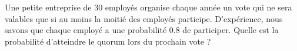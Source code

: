 
\begin{exercice}\label{exoPremiere-0099}

    Une petite entreprise de \( 30\) employés organise chaque année un vote qui ne sera valables que si au moins la moitié des employés participe. D'expérience, nous savons que chaque employé a une probabilité \( 0.8\) de participer. Quelle est la probabilité d'atteindre le quorum lors du prochain vote ?

\end{exercice}
